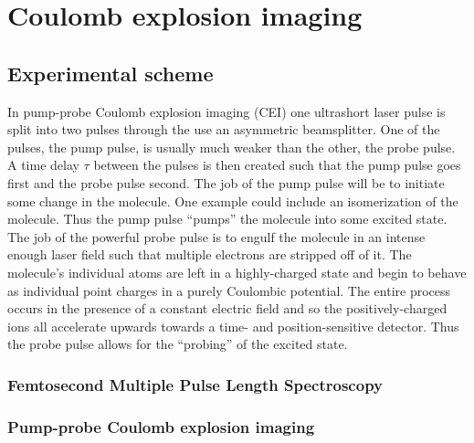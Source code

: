 \chapter{Coulomb explosion imaging}\label{ch:CEI}

\section{Experimental scheme}
In pump-probe Coulomb explosion imaging (CEI) one ultrashort laser pulse is split into two pulses through the use an asymmetric beamsplitter. One of the pulses, the pump pulse, is usually much weaker than the other, the probe pulse. A time delay $\tau$ between the pulses is then created such that the pump pulse goes first and the probe pulse second. The job of the pump pulse will be to initiate some change in the molecule. One example could include an isomerization of the molecule. Thus the pump pulse ``pumps'' the molecule into some excited state. The job of the powerful probe pulse is to engulf the molecule in an intense enough laser field such that multiple electrons are stripped off of it. The molecule's individual atoms are left in a highly-charged state and begin to behave as individual point charges in a purely Coulombic potential. The entire process occurs in the presence of a constant electric field and so the positively-charged ions all accelerate upwards towards a time- and position-sensitive detector. Thus the probe pulse allows for the ``probing'' of the excited state.

%

\subsection{Femtosecond Multiple Pulse Length Spectroscopy}
\subsection{Pump-probe Coulomb explosion imaging}

